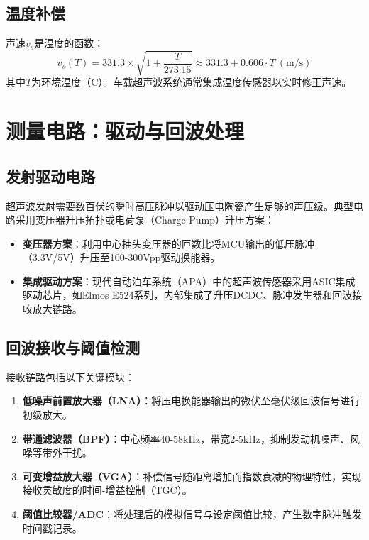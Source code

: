 \documentclass[12pt,a4paper,openany,UTF8]{ctexbook}
\begin{document}
\subsection{温度补偿}

声速$v_s$是温度的函数：
\begin{equation}\label{eq:sound_speed}
v_s(T) = 331.3 \times \sqrt{1 + \frac{T}{273.15}} \approx 331.3 + 0.606 \cdot T \ (\text{m/s})
\end{equation}
其中$T$为环境温度（\textdegree C）。车载超声波系统通常集成温度传感器以实时修正声速。

\section{测量电路：驱动与回波处理}

\subsection{发射驱动电路}

超声波发射需要数百伏的瞬时高压脉冲以驱动压电陶瓷产生足够的声压级。典型电路采用变压器升压拓扑或电荷泵（Charge Pump）升压方案：
\begin{itemize}
    \item \textbf{变压器方案}：利用中心抽头变压器的匝数比将MCU输出的低压脉冲（3.3V/5V）升压至100-300Vpp驱动换能器。
    \item \textbf{集成驱动方案}：现代自动泊车系统（APA）中的超声波传感器采用ASIC集成驱动芯片，如Elmos E524系列，内部集成了升压DCDC、脉冲发生器和回波接收放大链路。
\end{itemize}

\subsection{回波接收与阈值检测}

接收链路包括以下关键模块：
\begin{enumerate}
    \item \textbf{低噪声前置放大器（LNA）}：将压电换能器输出的微伏至毫伏级回波信号进行初级放大。
    \item \textbf{带通滤波器（BPF）}：中心频率40-58kHz，带宽2-5kHz，抑制发动机噪声、风噪等带外干扰。
    \item \textbf{可变增益放大器（VGA）}：补偿信号随距离增加而指数衰减的物理特性，实现接收灵敏度的时间-增益控制（TGC）。
    \item \textbf{阈值比较器/ADC}：将处理后的模拟信号与设定阈值比较，产生数字脉冲触发时间戳记录。
\end{enumerate}
\end{document}

